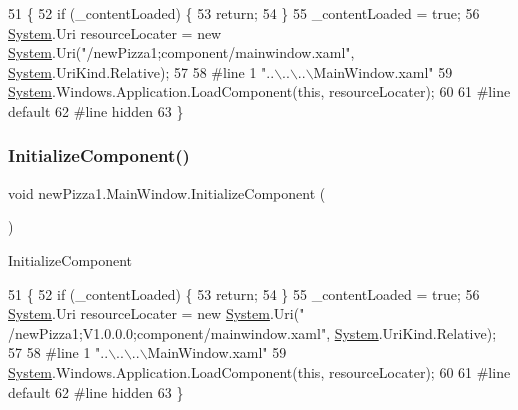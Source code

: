 \begin{DoxyCode}
51                                           \{
52             \textcolor{keywordflow}{if} (\_contentLoaded) \{
53                 \textcolor{keywordflow}{return};
54             \}
55             \_contentLoaded = \textcolor{keyword}{true};
56             \hyperlink{namespaceSystem}{System}.Uri resourceLocater = \textcolor{keyword}{new} \hyperlink{namespaceSystem}{System}.Uri(\textcolor{stringliteral}{"/newPizza1;component/mainwindow.xaml"},
       \hyperlink{namespaceSystem}{System}.UriKind.Relative);
57             
58 \textcolor{preprocessor}{            #line 1 "..\(\backslash\)..\(\backslash\)..\(\backslash\)MainWindow.xaml"}
59             \hyperlink{namespaceSystem}{System}.Windows.Application.LoadComponent(\textcolor{keyword}{this}, resourceLocater);
60             
61 \textcolor{preprocessor}{            #line default}
62 \textcolor{preprocessor}{            #line hidden}
63         \}
\end{DoxyCode}
\mbox{\label{classnewPizza1_1_1MainWindow_abfa6d086ad6fa95a25da1f69351890ba}} 
\subsubsection{\texorpdfstring{Initialize\+Component()}{InitializeComponent()}\hspace{0.1cm}{\footnotesize\ttfamily [3/3]}}
{\footnotesize\ttfamily void new\+Pizza1.\+Main\+Window.\+Initialize\+Component (\begin{DoxyParamCaption}{ }\end{DoxyParamCaption})\hspace{0.3cm}{\ttfamily [inline]}}



Initialize\+Component 


\begin{DoxyCode}
51                                           \{
52             \textcolor{keywordflow}{if} (\_contentLoaded) \{
53                 \textcolor{keywordflow}{return};
54             \}
55             \_contentLoaded = \textcolor{keyword}{true};
56             \hyperlink{namespaceSystem}{System}.Uri resourceLocater = \textcolor{keyword}{new} \hyperlink{namespaceSystem}{System}.Uri(\textcolor{stringliteral}{"
      /newPizza1;V1.0.0.0;component/mainwindow.xaml"}, \hyperlink{namespaceSystem}{System}.UriKind.Relative);
57             
58 \textcolor{preprocessor}{            #line 1 "..\(\backslash\)..\(\backslash\)..\(\backslash\)MainWindow.xaml"}
59             \hyperlink{namespaceSystem}{System}.Windows.Application.LoadComponent(\textcolor{keyword}{this}, resourceLocater);
60             
61 \textcolor{preprocessor}{            #line default}
62 \textcolor{preprocessor}{            #line hidden}
63         \}
\end{DoxyCode}


